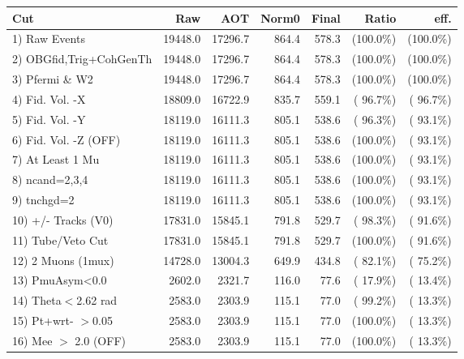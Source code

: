  \begin{table}[h!]\centering
 \begin{tabular}{||l||r|r|r|r|r|r||}
 \hline
 \hline
 Cut & Raw & AOT & Norm0 & Final & Ratio & eff.       \\
 \hline
  1) Raw Events           &      19448.0 &      17296.7 &        864.4 &        578.3 & (100.0\%) & (100.0\%) \\
  2) OBGfid,Trig+CohGenTh &      19448.0 &      17296.7 &        864.4 &        578.3 & (100.0\%) & (100.0\%) \\
  3) Pfermi \& W2         &      19448.0 &      17296.7 &        864.4 &        578.3 & (100.0\%) & (100.0\%) \\
  4) Fid. Vol. -X         &      18809.0 &      16722.9 &        835.7 &        559.1 & ( 96.7\%) & ( 96.7\%) \\
  5) Fid. Vol. -Y         &      18119.0 &      16111.3 &        805.1 &        538.6 & ( 96.3\%) & ( 93.1\%) \\
  6) Fid. Vol. -Z (OFF)   &      18119.0 &      16111.3 &        805.1 &        538.6 & (100.0\%) & ( 93.1\%) \\
  7) At Least 1 Mu        &      18119.0 &      16111.3 &        805.1 &        538.6 & (100.0\%) & ( 93.1\%) \\
  8) ncand=2,3,4          &      18119.0 &      16111.3 &        805.1 &        538.6 & (100.0\%) & ( 93.1\%) \\
  9) tnchgd=2             &      18119.0 &      16111.3 &        805.1 &        538.6 & (100.0\%) & ( 93.1\%) \\
 10) +/- Tracks (V0)      &      17831.0 &      15845.1 &        791.8 &        529.7 & ( 98.3\%) & ( 91.6\%) \\
 11) Tube/Veto Cut        &      17831.0 &      15845.1 &        791.8 &        529.7 & (100.0\%) & ( 91.6\%) \\
 12) 2 Muons (1mux)       &      14728.0 &      13004.3 &        649.9 &        434.8 & ( 82.1\%) & ( 75.2\%) \\
 13) PmuAsym<0.0          &       2602.0 &       2321.7 &        116.0 &         77.6 & ( 17.9\%) & ( 13.4\%) \\
 14) Theta$<$2.62 rad     &       2583.0 &       2303.9 &        115.1 &         77.0 & ( 99.2\%) & ( 13.3\%) \\
 15) Pt+wrt- $>$0.05      &       2583.0 &       2303.9 &        115.1 &         77.0 & (100.0\%) & ( 13.3\%) \\
 16) Mee $>$ 2.0  (OFF)   &       2583.0 &       2303.9 &        115.1 &         77.0 & (100.0\%) & ( 13.3\%) \\

\end{tabular}
\end{table}
